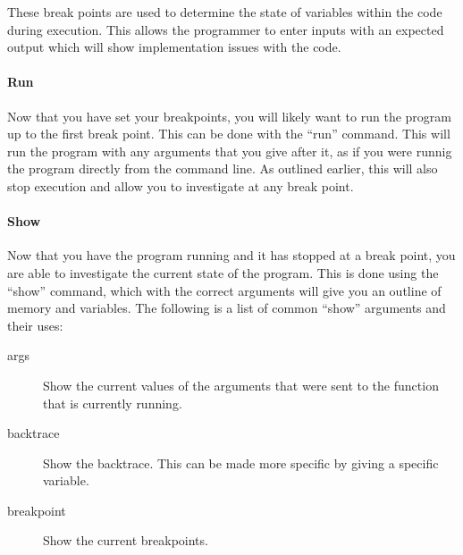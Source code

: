 		These break points are used to determine the state of variables within the code during execution.
		This allows the programmer to enter inputs with an expected output which will show implementation issues with the code.

		\paragraph{Run}
		Now that you have set your breakpoints, you will likely want to run the program up to the first break point.
		This can be done with the ``run'' command.
		This will run the program with any arguments that you give after it,
		as if you were runnig the program directly from the command line.
		As outlined earlier, this will also stop execution and allow you to investigate at any break point.

		\paragraph{Show}
		Now that you have the program running and it has stopped at a break point,
		you are able to investigate the current state of the program.
		This is done using the ``show'' command, which with the correct arguments will give you an outline of memory and variables.
		The following is a list of common ``show'' arguments and their uses:
		\begin{description}
			\item[args] Show the current values of the arguments that were sent to the function that is currently running.
			\item[backtrace] Show the backtrace. This can be made more specific by giving a specific variable.
			\item[breakpoint] Show the current breakpoints.
		\end{description}

